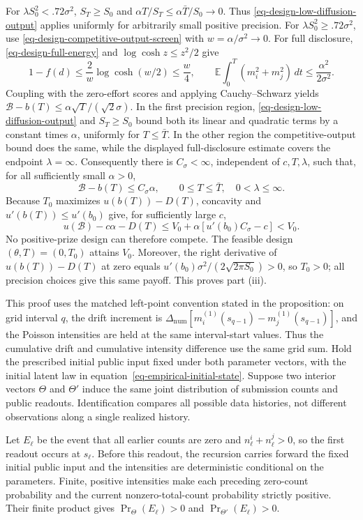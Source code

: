\documentclass[mnsc]{informs3}
\begin{document}
\begin{APPENDICES}
{For $\lambda S_0^2<.72\sigma^2$, $S_T\geq S_0$ and
$\alpha T/S_T\leq\alpha\bar T/S_0\to0$.
Thus \eqref{eq-design-low-diffusion-output} applies uniformly for arbitrarily
small positive precision.
For $\lambda S_0^2\geq.72\sigma^2$, use
\eqref{eq-design-competitive-output-screen} with $w=\alpha/\sigma^2\to0$.
For full disclosure, \eqref{eq-design-full-energy} and
$\log\cosh z\leq z^2/2$ give
\[
1-f(d)\leq\frac2w\log\cosh(w/2)\leq\frac w4,
\qquad
\mathbb E\int_0^T(m_i^2+m_j^2)\,dt\leq\frac{\alpha^2}{2\sigma^2}.
\]
Coupling with the zero-effort scores and applying Cauchy--Schwarz yields
$\mathcal B-b(T)\leq\alpha\sqrt{T}/(\sqrt2\sigma)$.
In the first precision region, \eqref{eq-design-low-diffusion-output}
and $S_T\geq S_0$ bound both its linear and quadratic terms by a constant
times $\alpha$, uniformly for $T\leq\bar T$. In the other region the
competitive-output bound does the same, while the displayed
full-disclosure estimate covers the endpoint $\lambda=\infty$.
Consequently there is $C_\sigma<\infty$, independent of $c,T,\lambda$,
such that, for all sufficiently small $\alpha>0$,
\[
\mathcal B-b(T)\leq C_\sigma\alpha,
\qquad 0\leq T\leq\bar T,\quad 0<\lambda\leq\infty.
\]
Because $T_0$ maximizes $u(b(T))-D(T)$, concavity and
$u'(b(T))\leq u'(b_0)$ give, for sufficiently large $c$,
\[
u(\mathcal B)-c\alpha-D(T)
\leq V_0+\alpha\left[u'(b_0)C_\sigma-c\right]<V_0.
\]
No positive-prize design can therefore compete. The feasible design
$(\theta,T)=(0,T_0)$ attains $V_0$. Moreover, the right derivative of
$u(b(T))-D(T)$ at zero equals
$u'(b_0)\sigma^2/(2\sqrt{2\pi S_0})>0$, so $T_0>0$;
all precision choices give this same payoff. {This proves part (iii).}
\Halmos
\endproof
}


{
{This proof uses the matched left-point convention stated in the proposition: on grid interval $q$, the drift increment is $\Delta_{\mathrm{num}}[m_i^{(1)}(s_{q-1})-m_j^{(1)}(s_{q-1})]$, and the Poisson intensities are held at the same interval-start values. Thus the cumulative drift and cumulative intensity difference use the same grid sum.}
Hold the prescribed initial public input fixed under both parameter vectors, with the initial latent law in equation~\eqref{eq-empirical-initial-state}. Suppose two interior vectors $\Theta$ and $\Theta'$ induce the same joint distribution of submission counts and public readouts. Identification compares all possible data histories, not different observations along a single realized history.

Let $E_\ell$ be the event that all earlier counts are zero and $n^i_\ell+n^j_\ell>0$, so the first readout occurs at $s_\ell$. Before this readout, the recursion carries forward the fixed initial public input and the intensities are deterministic conditional on the parameters. Finite, positive intensities make each preceding zero-count probability and the current nonzero-total-count probability strictly positive. Their finite product gives $\Pr_\Theta(E_\ell)>0$ and $\Pr_{\Theta'}(E_\ell)>0$.

}
\end{APPENDICES}
\end{document}
